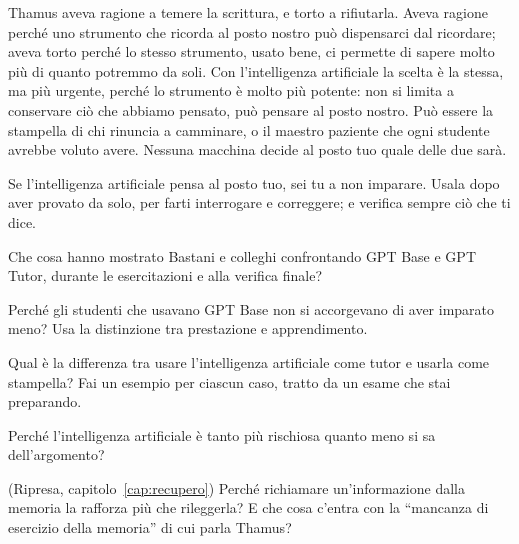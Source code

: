 \asterismo

Thamus aveva ragione a temere la scrittura, e torto a rifiutarla. Aveva
ragione perché uno strumento che ricorda al posto nostro può
dispensarci dal ricordare; aveva torto perché lo stesso strumento, usato
bene, ci permette di sapere molto più di quanto potremmo da soli. Con
l'intelligenza artificiale la scelta è la stessa, ma più urgente,
perché lo strumento è molto più potente: non si limita a conservare ciò
che abbiamo pensato, può pensare al posto nostro. Può essere la
stampella di chi rinuncia a camminare, o il maestro paziente che ogni
studente avrebbe voluto avere. Nessuna macchina decide al posto tuo
quale delle due sarà.

\begin{daricordare}
Se l'intelligenza artificiale pensa al posto tuo, sei tu a non
imparare. Usala dopo aver provato da solo, per farti interrogare e
correggere; e verifica sempre ciò che ti dice.
\end{daricordare}

\begin{domande}
  \item Che cosa hanno mostrato Bastani e colleghi confrontando GPT Base
        e GPT Tutor, durante le esercitazioni e alla verifica finale?
  \item Perché gli studenti che usavano GPT Base non si accorgevano di
        aver imparato meno? Usa la distinzione tra prestazione e
        apprendimento.
  \item Qual è la differenza tra usare l'intelligenza artificiale come
        tutor e usarla come stampella? Fai un esempio per ciascun caso,
        tratto da un esame che stai preparando.
  \item Perché l'intelligenza artificiale è tanto più rischiosa quanto
        meno si sa dell'argomento?
  \item (Ripresa, capitolo~\ref{cap:recupero}) Perché richiamare
        un'informazione dalla memoria la rafforza più che rileggerla? E
        che cosa c'entra con la \enquote{mancanza di esercizio della
        memoria} di cui parla Thamus?
\end{domande}

